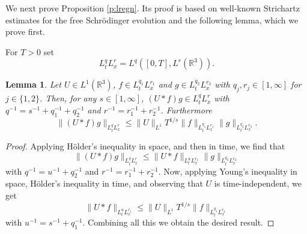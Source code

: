 \documentclass[11pt,a4paper,draft,DIV11]{scrartcl}	%
\newtheorem{lem}[thm]{Lemma}
\newcommand{\R}{\mathds{R}}
\begin{document}
We next prove Proposition \ref{p:lregn}. Its proof is based on well-known
Strichartz estimates for the free Schr\"odinger evolution and the following
lemma, which we prove first.


For $T > 0$ set
\[
  L_t^q L_x^r = L^q([0,T], L^r(\R^3)).
\]


\begin{lem} \label{l:interp}
  Let $U \in L^1(\R^3)$, $f \in L_t^{q_1} L_x^{r_1}$ and $g \in L_t^{q_2}
  L_x^{r_2}$ with $q_j, r_j \in [1,\infty]$ for $j \in \{1,2\}$. Then, for any $s \in [1, \infty]$, $(U * f)
  g \in L_t^q L_x^r$ with $q^{-1} = s^{-1} + q_1^{-1} + q_2^{-1}$ and $r^{-1}
  = r_1^{-1} + r_2^{-1}$. Furthermore
  \[
    \| (U * f)g \|_{L_t^q L_x^r} \le \| U \|_{L^1} T^{1/s} \| f \|_{L_t^{q_1}
    L_x^{r_1}} \| g \|_{L_t^{q_2} L_x^{r_2}}.
  \]
\end{lem}


\begin{proof}
  Applying H\"older's inequality in space, and then in time, we find that
  \[
    \| (U * f) g \|_{L_t^q L_x^r} \le \| U * f \|_{L_t^u L_x^{r_1}} \| g
    \|_{L_t^{q_2} L_x^{r_2}}
  \]
  with $q^{-1} = u^{-1} + q_2^{-1}$ and $r^{-1} = r_1^{-1} + r_2^{-1}$. Now,
  applying Young's inequality in space, H\"older's inequality in time, and
  observing that $U$ is time-independent, we get
  \[
    \| U * f \|_{L_t^u L_x^{r_1}} \le \| U \|_{L^1} T^{1/s} \| f \|_{L_t^{q_1}
    L_x^{r_1}}
  \]
  with $u^{-1} = s^{-1} + q_1^{-1}$. Combining all this we obtain the desired
  result.
\end{proof}
\end{document}
